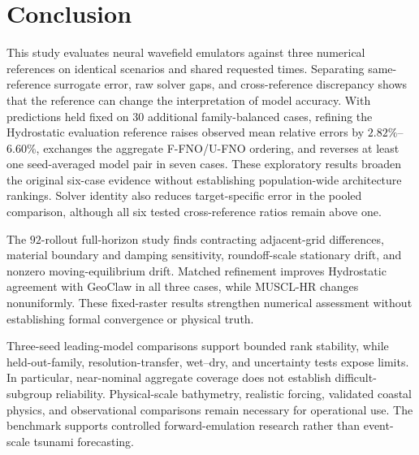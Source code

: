 \section{Conclusion}
\label{sec:conclusion}

This study evaluates neural wavefield emulators against three numerical references on identical scenarios and shared requested times. Separating same-reference surrogate error, raw solver gaps, and cross-reference discrepancy shows that the reference can change the interpretation of model accuracy. With predictions held fixed on $30$ additional family-balanced cases, refining the Hydrostatic evaluation reference raises observed mean relative errors by $2.82\%$--$6.60\%$, exchanges the aggregate F-FNO/U-FNO ordering, and reverses at least one seed-averaged model pair in seven cases. These exploratory results broaden the original six-case evidence without establishing population-wide architecture rankings. Solver identity also reduces target-specific error in the pooled comparison, although all six tested cross-reference ratios remain above one.

The $92$-rollout full-horizon study finds contracting adjacent-grid differences, material boundary and damping sensitivity, roundoff-scale stationary drift, and nonzero moving-equilibrium drift. Matched refinement improves Hydrostatic agreement with GeoClaw in all three cases, while MUSCL-HR changes nonuniformly. These fixed-raster results strengthen numerical assessment without establishing formal convergence or physical truth.

Three-seed leading-model comparisons support bounded rank stability, while held-out-family, resolution-transfer, wet--dry, and uncertainty tests expose limits. In particular, near-nominal aggregate coverage does not establish difficult-subgroup reliability. Physical-scale bathymetry, realistic forcing, validated coastal physics, and observational comparisons remain necessary for operational use. The benchmark supports controlled forward-emulation research rather than event-scale tsunami forecasting.
